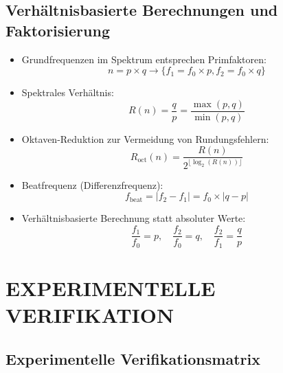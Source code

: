 \documentclass[12pt,a4paper]{article}
\begin{document}
	\subsection{Verhältnisbasierte Berechnungen und Faktorisierung}
	\begin{itemize}
		\item Grundfrequenzen im Spektrum entsprechen Primfaktoren:
		\begin{equation}
			n = p \times q \rightarrow \{f_1 = f_0 \times p, f_2 = f_0 \times q\}
		\end{equation}
		
		\item Spektrales Verhältnis:
		\begin{equation}
			R(n) = \frac{q}{p} = \frac{\max(p,q)}{\min(p,q)}
		\end{equation}
		
		\item Oktaven-Reduktion zur Vermeidung von Rundungsfehlern:
		\begin{equation}
			R_{\text{oct}}(n) = \frac{R(n)}{2^{\lfloor\log_2(R(n))\rfloor}}
		\end{equation}
		
		\item Beatfrequenz (Differenzfrequenz):
		\begin{equation}
			f_{\text{beat}} = |f_2 - f_1| = f_0 \times |q - p|
		\end{equation}
		
		\item Verhältnisbasierte Berechnung statt absoluter Werte:
		\begin{equation}
			\frac{f_1}{f_0} = p, \quad \frac{f_2}{f_0} = q, \quad \frac{f_2}{f_1} = \frac{q}{p}
		\end{equation}
	\end{itemize}
	
	\section{EXPERIMENTELLE VERIFIKATION}
	
	\subsection{Experimentelle Verifikationsmatrix}
	
\end{document}
